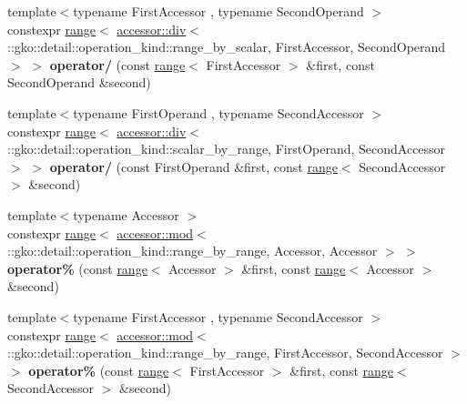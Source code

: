 \begin{DoxyCompactItemize}
\item 
\mbox{\label{namespacegko_a3b921aed556c1773376ad2feb082fafb}} 
{\footnotesize template$<$typename First\+Accessor , typename Second\+Operand $>$ }\\constexpr \hyperlink{classgko_1_1range}{range}$<$ \hyperlink{structgko_1_1accessor_1_1div}{accessor\+::div}$<$ \+::gko\+::detail\+::operation\+\_\+kind\+::range\+\_\+by\+\_\+scalar, First\+Accessor, Second\+Operand $>$ $>$ {\bfseries operator/} (const \hyperlink{classgko_1_1range}{range}$<$ First\+Accessor $>$ \&first, const Second\+Operand \&second)
\item 
\mbox{\label{namespacegko_ad617073f36809325a11db56fc66d433e}} 
{\footnotesize template$<$typename First\+Operand , typename Second\+Accessor $>$ }\\constexpr \hyperlink{classgko_1_1range}{range}$<$ \hyperlink{structgko_1_1accessor_1_1div}{accessor\+::div}$<$ \+::gko\+::detail\+::operation\+\_\+kind\+::scalar\+\_\+by\+\_\+range, First\+Operand, Second\+Accessor $>$ $>$ {\bfseries operator/} (const First\+Operand \&first, const \hyperlink{classgko_1_1range}{range}$<$ Second\+Accessor $>$ \&second)
\item 
\mbox{\label{namespacegko_aabcbe4818e5316566e04afa5d653ec23}} 
{\footnotesize template$<$typename Accessor $>$ }\\constexpr \hyperlink{classgko_1_1range}{range}$<$ \hyperlink{structgko_1_1accessor_1_1mod}{accessor\+::mod}$<$ \+::gko\+::detail\+::operation\+\_\+kind\+::range\+\_\+by\+\_\+range, Accessor, Accessor $>$ $>$ {\bfseries operator\%} (const \hyperlink{classgko_1_1range}{range}$<$ Accessor $>$ \&first, const \hyperlink{classgko_1_1range}{range}$<$ Accessor $>$ \&second)
\item 
\mbox{\label{namespacegko_af02261bf3b7594d48bb51093593896e1}} 
{\footnotesize template$<$typename First\+Accessor , typename Second\+Accessor $>$ }\\constexpr \hyperlink{classgko_1_1range}{range}$<$ \hyperlink{structgko_1_1accessor_1_1mod}{accessor\+::mod}$<$ \+::gko\+::detail\+::operation\+\_\+kind\+::range\+\_\+by\+\_\+range, First\+Accessor, Second\+Accessor $>$ $>$ {\bfseries operator\%} (const \hyperlink{classgko_1_1range}{range}$<$ First\+Accessor $>$ \&first, const \hyperlink{classgko_1_1range}{range}$<$ Second\+Accessor $>$ \&second)

\end{DoxyCompactItemize}
